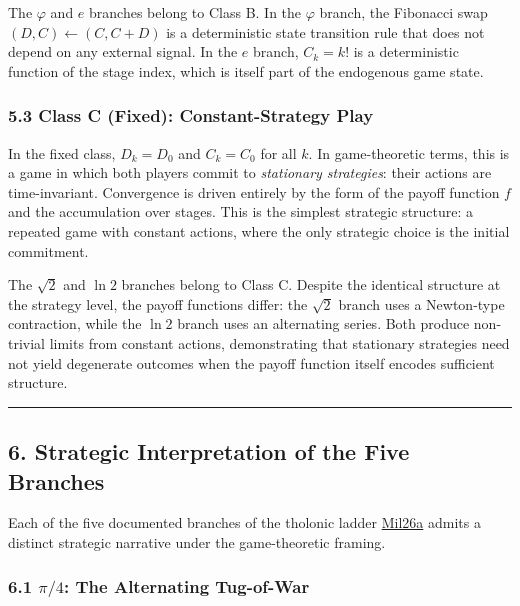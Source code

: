\documentclass[
  11pt,
  letterpaper,
]{article}
\begin{document}
The \(\varphi\) and \(e\) branches belong to Class B. In the \(\varphi\)
branch, the Fibonacci swap \((D, C) \leftarrow (C, C + D)\) is a
deterministic state transition rule that does not depend on any external
signal. In the \(e\) branch, \(C_k = k!\) is a deterministic function of
the stage index, which is itself part of the endogenous game state.

\subsubsection{5.3 Class C (Fixed): Constant-Strategy
Play}\label{class-c-fixed-constant-strategy-play}

In the fixed class, \(D_k = D_0\) and \(C_k = C_0\) for all \(k\). In
game-theoretic terms, this is a game in which both players commit to
\emph{stationary strategies}: their actions are time-invariant.
Convergence is driven entirely by the form of the payoff function \(f\)
and the accumulation over stages. This is the simplest strategic
structure: a repeated game with constant actions, where the only
strategic choice is the initial commitment.

The \(\sqrt{2}\) and \(\ln 2\) branches belong to Class C. Despite the
identical structure at the strategy level, the payoff functions differ:
the \(\sqrt{2}\) branch uses a Newton-type contraction, while the
\(\ln 2\) branch uses an alternating series. Both produce non-trivial
limits from constant actions, demonstrating that stationary strategies
need not yield degenerate outcomes when the payoff function itself
encodes sufficient structure.

\begin{center}\rule{0.5\linewidth}{0.5pt}\end{center}

\subsection{6. Strategic Interpretation of the Five
Branches}\label{strategic-interpretation-of-the-five-branches}

Each of the five documented branches of the tholonic ladder
\href{https://github.com/baardev/truevalue/blob/main/docnav/Research/papers/1_recursive-tholonic-five-constants/1_recursive-tholonic-five-constants.pdf}{Mil26a}
admits a distinct strategic narrative under the game-theoretic framing.

\subsubsection{\texorpdfstring{6.1 \(\pi/4\): The Alternating
Tug-of-War}{6.1 \textbackslash pi/4: The Alternating Tug-of-War}}\label{pi4-the-alternating-tug-of-war}
\end{document}
